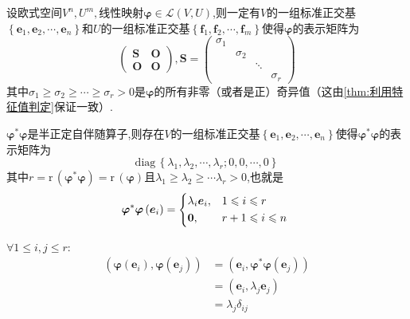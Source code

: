 \begin{formal}
    \begin{theorem}[奇异值构成的表示矩阵]\label{thm:奇异值构成的表示矩阵}
        设欧式空间$V^n,U^m,$线性映射$\bm{\varphi}\in\mathcal{L}\left(V,U\right)$,则一定有$V$的一组标准正交基$\left\{
            \bm{e}_1,\bm{e}_2,\cdots,\bm{e}_n
        \right\}$和$U$的一组标准正交基$\left\{
            \bm{f}_1,\bm{f}_2,\cdots,\bm{f}_m
        \right\}$使得$\bm{\varphi}$的表示矩阵为\[
        \begin{pmatrix}
            \bm{S}&\bm{O}\\
            \bm{O}&\bm{O}
        \end{pmatrix},
        \bm{S}=\begin{pmatrix}
            \sigma_1&&&\\
            &\sigma_2&&\\
            &&\ddots&\\
            &&&\sigma_r
        \end{pmatrix}
        \]其中$\sigma_1\geqslant\sigma_2\geqslant\cdots\geqslant\sigma_r>0$是$\bm{\varphi}$的所有非零（或者是正）奇异值（这由\cref{thm:利用特征值判定}保证一致）.
    \end{theorem}
    \begin{Proof}
        $\bm{\varphi}^*\bm{\varphi}$是半正定自伴随算子,则存在$V$的一组标准正交基$\left\{
            \bm{e}_1,\bm{e}_2,\cdots,\bm{e}_n
            \right\}$使得$\bm{\varphi}^*\bm{\varphi}$的表示矩阵为\[
            \mathrm{diag}\,\left\{
                \lambda_1,\lambda_2,\cdots,\lambda_r;0,0,\cdots,0
            \right\}
            \]其中$r=\mathrm{r}\,\left(\bm{\varphi}^*\bm{\varphi}\right)=\mathrm{r}\,\left(\bm{\varphi}\right)$且$\lambda_1\geqslant\lambda_2\geqslant\cdots\lambda_r>0$,也就是\[
            \bm{\varphi}^*\bm{\varphi}\left(
                \bm{e}_i
            \right)=\begin{cases*}
                \lambda_i\bm{e}_i,&$1\leqslant i\leqslant r$\\
                \bm{0},&$r+1\leqslant i\leqslant n$
            \end{cases*}
            \]

            $\forall1\leqslant i,j\leqslant r:$\begin{align*}
                \left(
                    \bm{\varphi}\left(
                        \bm{e}_i
                    \right),\bm{\varphi}\left(
                        \bm{e}_j
                        \right)
                \right)&=\left(
                    \bm{e}_i,\bm{\varphi}^*\bm{\varphi}\left(
                        \bm{e}_j
                        \right)
                \right)\\
                &=\left(
                    \bm{e}_i,\lambda_j\bm{e}_j
                \right)\\
                &=\lambda_j\delta_{ij}
            \end{align*}


\end{Proof}
\end{formal}
